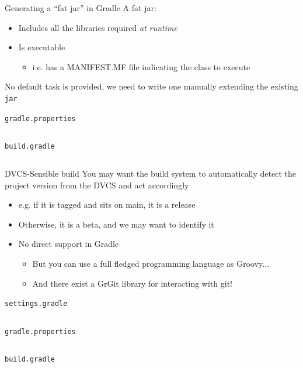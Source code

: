 \documentclass[presentation]{beamer}
\newcommand{\codefile}[4]{
	\begin{block}{\texttt{#2}}
		\inputminted[fontsize=#3,linenos=true,breaklines=true]{#4}{"workspace/#1/#2"}
	\end{block}
}
\newcommand{\groovy}[3]{\codefile{#1}{#2}{#3}{groovy}}
\newcommand{\tinier}{\fontsize{4pt}{5pt}\selectfont}
\begin{document}
\begin{frame}{Generating a ``fat jar'' in Gradle}
    A fat jar:
    \begin{itemize}
        \item Includes all the libraries required \textit{at runtime}
        \item Is executable
        \begin{itemize}
            \item i.e. has a MANIFEST.MF file indicating the class to execute
        \end{itemize}
    \end{itemize}
    No default task is provided, we need to write one manually extending the existing \texttt{jar}
    \groovy{24-Fatjar}{gradle.properties}{\scriptsize}
    \groovy{24-Fatjar}{build.gradle}{\tinier}
\end{frame}

\begin{frame}{DVCS-Sensible build}
    You may want the build system to automatically detect the project version from the DVCS and act accordingly
    \begin{itemize}
        \item e.g. if it is tagged and sits on main, it is a release
        \item Otherwise, it is a beta, and we may want to identify it
        \item No direct support in Gradle 
        \begin{itemize}
            \item But you can use a full fledged programming language as Groovy...
            \item And there exist a GrGit library for interacting with git!
        \end{itemize}
    \end{itemize}
    \groovy{26-Git}{settings.gradle}{\scriptsize}
    \groovy{26-Git}{gradle.properties}{\scriptsize}
    \groovy{26-Git}{build.gradle}{\tiny}
\end{frame}
\end{document}
